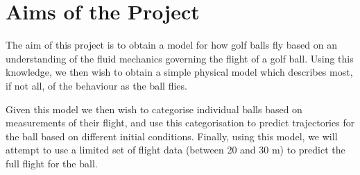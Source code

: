 \section{Aims of the Project}

The aim of this project is to obtain a model for how golf balls fly based on an understanding of the
fluid mechanics governing the flight of a golf ball. Using this knowledge, we then wish to obtain a
simple physical model which describes most, if not all, of the behaviour as the ball flies.

Given this model we then wish to categorise individual balls based on measurements of their flight, and
use this categorisation to predict trajectories for the ball based on different initial conditions.
Finally, using this model, we will attempt to use a limited set of flight data (between 20 and 30 m)
to predict the full flight for the ball.